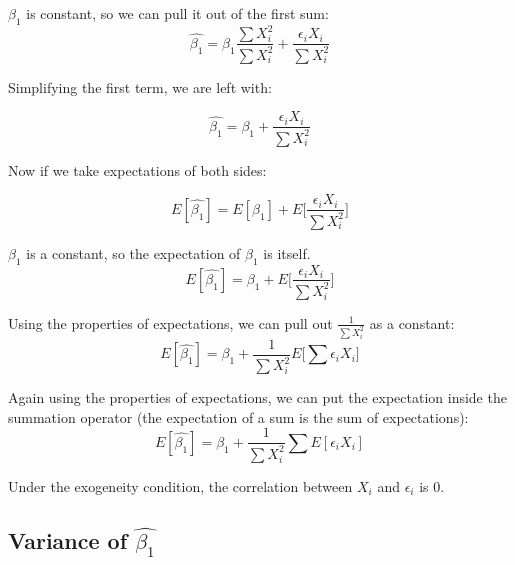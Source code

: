 \documentclass{article}
\begin{document}
$\beta_1$ is constant, so we can pull it out of the first sum:
\begin{equation}
\hat{\beta_1}=\beta_1 \frac{\sum X_i^2}{\sum X_i^2}+\frac{\epsilon_i X_i}{\sum X_i^2}
\end{equation}

Simplifying the first term, we are left with:

\begin{equation}
\hat{\beta_1}=\beta_1 +\frac{\epsilon_i X_i}{\sum X_i^2}
\end{equation}

Now if we take expectations of both sides: 

\begin{equation}
E[\hat{\beta_1}]=E[\beta_1] +E\bigg[\frac{\epsilon_i X_i}{\sum X_i^2}\bigg]
\end{equation}

$\beta_1$ is a constant, so the expectation of $\beta_1$ is itself. 
\begin{equation}
E[\hat{\beta_1}]=\beta_1 +E\bigg[\frac{\epsilon_i X_i}{\sum X_i^2}\bigg]
\end{equation}

Using the properties of expectations, we can pull out $\frac{1}{\sum X_i^2}$ as a constant:
\begin{equation}
E[\hat{\beta_1}]=\beta_1 +\frac{1}{\sum X_i^2} E\bigg[\sum \epsilon_i X_i\bigg]
\end{equation}

Again using the properties of expectations, we can put the expectation inside the summation operator (the expectation of a sum is the sum of expectations):
\begin{equation}
E[\hat{\beta_1}]=\beta_1 +\frac{1}{\sum X_i^2}\sum E[\epsilon_i X_i]
\end{equation}

Under the exogeneity condition, the correlation between $X_i$ and $\epsilon_i$ is 0. 

\subsection{Variance of $\hat{\beta_1}$}
\end{document}
